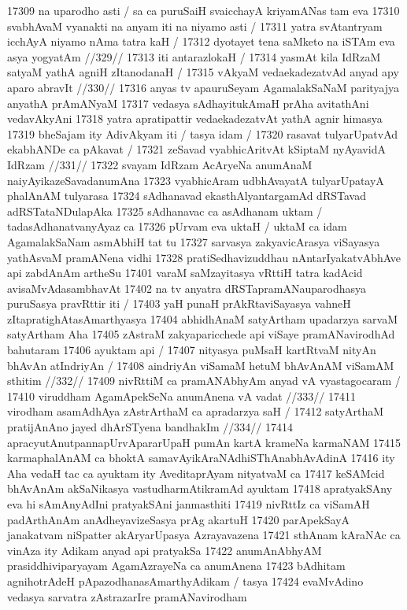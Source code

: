 17309 na uparodho asti / sa ca puruSaiH svaicchayA kriyamANas tam eva  
17310 svabhAvaM vyanakti na anyam iti na niyamo asti / 
17311 	yatra svAtantryam icchAyA niyamo nAma tatra kaH / 
17312 	dyotayet tena saMketo na iSTAm eva asya yogyatAm //329//  
17313 iti antarazlokaH /  
17314 	yasmAt kila IdRzaM satyaM yathA agniH zItanodanaH / 
17315 	vAkyaM vedaekadezatvAd anyad apy aparo abravIt //330//  
17316 anyas tv apauruSeyam AgamalakSaNaM parityajya anyathA prAmANyaM
17317 vedasya sAdhayitukAmaH prAha avitathAni vedavAkyAni 
17318 yatra apratipattir vedaekadezatvAt yathA agnir himasya  
17319 bheSajam ity AdivAkyam iti / tasya idam /
17320 	rasavat tulyarUpatvAd ekabhANDe ca pAkavat /  
17321 	zeSavad vyabhicAritvAt kSiptaM nyAyavidA IdRzam //331//
17322 svayam IdRzam AcAryeNa anumAnaM naiyAyikazeSavadanumAna 
17323 vyabhicAram udbhAvayatA tulyarUpatayA phalAnAM tulyarasa  
17324 sAdhanavad ekasthAlyantargamAd dRSTavad adRSTataNDulapAka
17325 sAdhanavac ca asAdhanam uktam / tadasAdhanatvanyAyaz ca
17326 pUrvam eva uktaH / uktaM ca idam AgamalakSaNam asmAbhiH tat tu  
17327 sarvasya zakyavicArasya viSayasya yathAsvaM pramANena vidhi 
17328 pratiSedhavizuddhau nAntarIyakatvAbhAve api zabdAnAm artheSu
17401 varaM saMzayitasya vRttiH tatra kadAcid avisaMvAdasambhavAt  
17402 na tv anyatra dRSTapramANauparodhasya puruSasya pravRttir iti /  
17403 yaH punaH prAkRtaviSayasya vahneH zItapratighAtasAmarthyasya 
17404 abhidhAnaM satyArtham upadarzya sarvaM satyArtham Aha
17405 zAstraM zakyaparicchede api viSaye pramANavirodhAd bahutaram
17406 ayuktam api / 
17407 	nityasya puMsaH kartRtvaM nityAn bhAvAn atIndriyAn /
17408 	aindriyAn viSamaM hetuM bhAvAnAM viSamAM sthitim //332//  
17409 	nivRttiM ca pramANAbhyAm anyad vA vyastagocaram /
17410 	viruddham AgamApekSeNa anumAnena vA vadat //333//
17411 	virodham asamAdhAya zAstrArthaM ca apradarzya saH / 
17412 	satyArthaM pratijAnAno jayed dhArSTyena bandhakIm //334//
17414 apracyutAnutpannapUrvApararUpaH pumAn kartA krameNa karmaNAM  
17415 karmaphalAnAM ca bhoktA samavAyikAraNAdhiSThAnabhAvAdinA  
17416 ity Aha vedaH tac ca ayuktam ity AveditaprAyam nityatvaM ca  
17417 keSAMcid bhAvAnAm akSaNikasya vastudharmAtikramAd ayuktam
17418 apratyakSAny eva hi sAmAnyAdIni pratyakSAni janmasthiti
17419 nivRttIz ca viSamAH padArthAnAm anAdheyavizeSasya prAg akartuH  
17420 parApekSayA janakatvam niSpatter akAryarUpasya Azrayavazena 
17421 sthAnam kAraNAc ca vinAza ity Adikam anyad api pratyakSa
17422 anumAnAbhyAM prasiddhiviparyayam AgamAzrayeNa ca anumAnena 
17423 bAdhitam agnihotrAdeH pApazodhanasAmarthyAdikam / tasya  
17424 evaMvAdino vedasya sarvatra zAstrazarIre pramANavirodham

